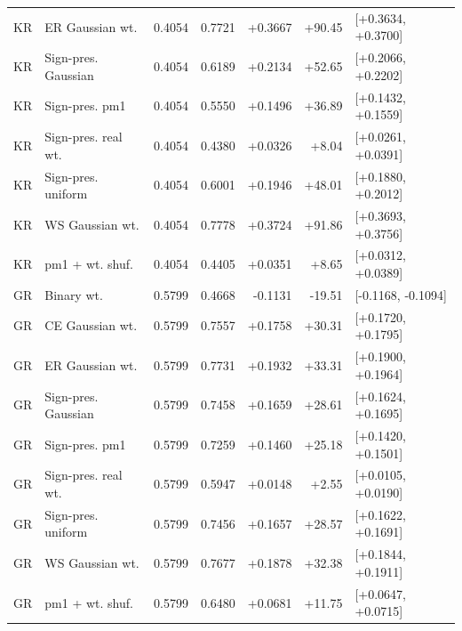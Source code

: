 \begin{tabular}{llrrrrl}
KR & ER Gaussian wt. & 0.4054 & 0.7721 & +0.3667 & +90.45 & [+0.3634, +0.3700] \\
KR & Sign-pres. Gaussian & 0.4054 & 0.6189 & +0.2134 & +52.65 & [+0.2066, +0.2202] \\
KR & Sign-pres. pm1 & 0.4054 & 0.5550 & +0.1496 & +36.89 & [+0.1432, +0.1559] \\
KR & Sign-pres. real wt. & 0.4054 & 0.4380 & +0.0326 & +8.04 & [+0.0261, +0.0391] \\
KR & Sign-pres. uniform & 0.4054 & 0.6001 & +0.1946 & +48.01 & [+0.1880, +0.2012] \\
KR & WS Gaussian wt. & 0.4054 & 0.7778 & +0.3724 & +91.86 & [+0.3693, +0.3756] \\
KR & pm1 + wt. shuf. & 0.4054 & 0.4405 & +0.0351 & +8.65 & [+0.0312, +0.0389] \\
GR & Binary wt. & 0.5799 & 0.4668 & -0.1131 & -19.51 & [-0.1168, -0.1094] \\
GR & CE Gaussian wt. & 0.5799 & 0.7557 & +0.1758 & +30.31 & [+0.1720, +0.1795] \\
GR & ER Gaussian wt. & 0.5799 & 0.7731 & +0.1932 & +33.31 & [+0.1900, +0.1964] \\
GR & Sign-pres. Gaussian & 0.5799 & 0.7458 & +0.1659 & +28.61 & [+0.1624, +0.1695] \\
GR & Sign-pres. pm1 & 0.5799 & 0.7259 & +0.1460 & +25.18 & [+0.1420, +0.1501] \\
GR & Sign-pres. real wt. & 0.5799 & 0.5947 & +0.0148 & +2.55 & [+0.0105, +0.0190] \\
GR & Sign-pres. uniform & 0.5799 & 0.7456 & +0.1657 & +28.57 & [+0.1622, +0.1691] \\
GR & WS Gaussian wt. & 0.5799 & 0.7677 & +0.1878 & +32.38 & [+0.1844, +0.1911] \\
GR & pm1 + wt. shuf. & 0.5799 & 0.6480 & +0.0681 & +11.75 & [+0.0647, +0.0715] \\
\bottomrule
\end{tabular}
